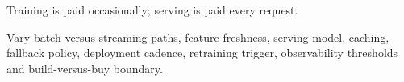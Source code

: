 \begin{calloutmemoryhook}
Training is paid occasionally; serving is paid every request.
\end{calloutmemoryhook}

\begin{calloutdegreeofexperiment}
Vary batch versus streaming paths, feature freshness, serving model, caching, fallback policy, deployment cadence, retraining trigger, observability thresholds and build-versus-buy boundary.
\end{calloutdegreeofexperiment}
